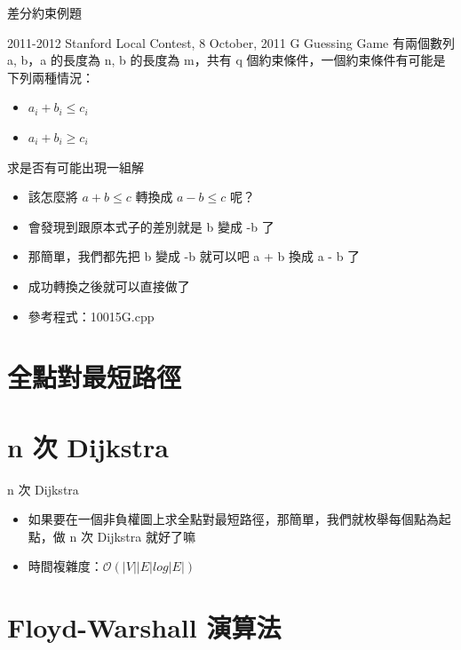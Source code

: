 \documentclass[aspectratio=169]{beamer}
\begin{document}
    \begin{frame}{差分約束例題}
        \begin{block}{2011-2012 Stanford Local Contest, 8 October, 2011 G Guessing Game}
            有兩個數列 a, b，a 的長度為 n, b 的長度為 m，共有 q 個約束條件，一個約束條件有可能是下列兩種情況：
            \begin{itemize}
                \item $a_i + b_i \le c_i$
                \item $a_i + b_i \ge c_i$
            \end{itemize}
            求是否有可能出現一組解
        \end{block}

        \begin{itemize}
            \item<2-> 該怎麼將 $a + b \le c$ 轉換成 $a - b \le c$ 呢？
            \item<3-> 會發現到跟原本式子的差別就是 b 變成 -b 了
            \item<4-> 那簡單，我們都先把 b 變成 -b 就可以吧 a + b 換成 a - b 了
            \item<5-> 成功轉換之後就可以直接做了
            \item<5-> 參考程式：10015G.cpp
        \end{itemize}
    \end{frame}

    \section{全點對最短路徑}

    \section{n 次 Dijkstra}

    \begin{frame}{n 次 Dijkstra}
        \begin{itemize}
            \item 如果要在一個非負權圖上求全點對最短路徑，那簡單，我們就枚舉每個點為起點，做 n 次 Dijkstra 就好了嘛
            \item 時間複雜度：$\mathcal{O}(\lvert V \rvert\lvert E \rvert log \lvert E \rvert)$
        \end{itemize}
    \end{frame}

    \section{Floyd-Warshall 演算法}
\end{document}
